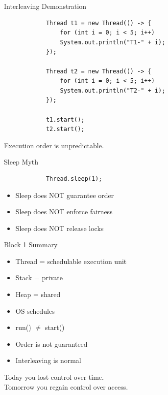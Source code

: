 \documentclass[aspectratio=169,11pt]{beamer}
\begin{document}
	\begin{frame}[fragile]{Interleaving Demonstration}
		\begin{lstlisting}
			Thread t1 = new Thread(() -> {
				for (int i = 0; i < 5; i++)
				System.out.println("T1-" + i);
			});
			
			Thread t2 = new Thread(() -> {
				for (int i = 0; i < 5; i++)
				System.out.println("T2-" + i);
			});
			
			t1.start();
			t2.start();
		\end{lstlisting}
		
		Execution order is unpredictable.
	\end{frame}
	
	\begin{frame}[fragile]{Sleep Myth}
		\begin{lstlisting}
			Thread.sleep(1);
		\end{lstlisting}
		
		\begin{itemize}
			\item Sleep does NOT guarantee order
			\item Sleep does NOT enforce fairness
			\item Sleep does NOT release locks
		\end{itemize}
	\end{frame}
	
	\begin{frame}{Block 1 Summary}
		\begin{itemize}
			\item Thread = schedulable execution unit
			\item Stack = private
			\item Heap = shared
			\item OS schedules
			\item run() $\neq$ start()
			\item Order is not guaranteed
			\item Interleaving is normal
		\end{itemize}
		
		\vspace{5mm}
		
		\begin{center}
			\Large
			Today you lost control over time. \\
			Tomorrow you regain control over access.
		\end{center}
	\end{frame}
	
\end{document}
